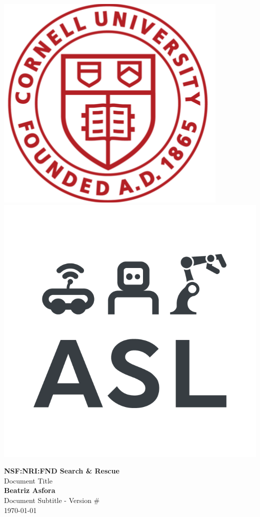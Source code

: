 \documentclass[letterpaper, 10 pt, journal, twoside]{article}
\begin{document}
	

	\begin{vwcol}[widths={0.3,0.7},sep=0.5cm, justify=flush,rule=0.2pt,indent=0em] 
		\vspace{1cm}
		\includegraphics[width=0.145\linewidth]{cu-logo} 
		\includegraphics[width=0.145\linewidth]{asl-logo}
		
		\large{\textbf{NSF:NRI:FND Search \& Rescue}}\\
		Document Title\\
		\large{\textbf{Beatriz Asfora}}\\
		Document Subtitle - Version \#\\
		\today 
	\end{vwcol} 

\vspace{5mm}




\small


\end{document}
